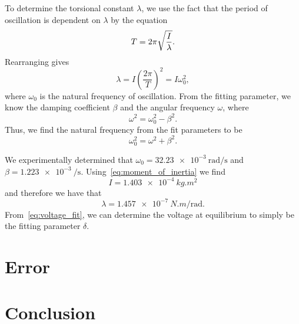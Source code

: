 \documentclass[aps, reprint,amsmath,amssymb]{revtex4-1} %
\begin{document}
To determine the torsional constant $\lambda$, we use the fact that the
period of oscillation is dependent on $\lambda$ by the equation
\[
    T = 2\pi \sqrt{I \over \lambda}.
\]
Rearranging gives
\[
    \lambda = I \left(\frac{2\pi}{T}\right)^2 = I \omega_0^2,
\]
where $\omega_0$ is the natural frequency of oscillation. From the fitting
parameter, we know the damping coefficient $\beta$ and the angular
frequency $\omega$, where
\[
    \omega^2 = \omega_0^2 - \beta^2.
\]
Thus, we find the natural frequency from the fit parameters to be
\[
    \omega_0^2 = \omega^2 + \beta^2.    
\]

We experimentally determined that $\omega_0 =
\SI{32.23e-3}{\radian\per\second}$ and $\beta = \SI{1.223e-3}{\per
\second}$. Using~\eqref{eq:moment_of_inertia} we find
\[
    I = \SI{1.403e-4}{kg.m^2}
\]
and therefore we have that
\[
    \lambda = \SI{1.457e-7}{N.m/\radian}.
\]
From~\eqref{eq:voltage_fit}, we can determine the voltage at equilibrium to
simply be the fitting parameter $\delta$. 


\section{Error}

\section{Conclusion}
\end{document}
